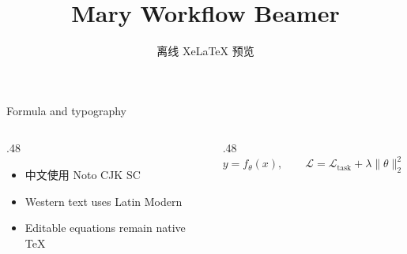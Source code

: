 \documentclass[aspectratio=169,10pt]{beamer}
\title[Mary Workflow]{Mary Workflow Beamer}
\subtitle{离线 XeLaTeX 预览}
\date{}
\begin{document}
\VSPtitleframe

\begin{frame}{Formula and typography}
  \begin{columns}[T,onlytextwidth]
    \begin{column}{.48\textwidth}
      \begin{itemize}
        \item 中文使用 Noto CJK SC
        \item Western text uses Latin Modern
        \item Editable equations remain native TeX
      \end{itemize}
    \end{column}
    \begin{column}{.48\textwidth}
      \[
        y=f_{\theta}(x),\qquad
        \mathcal{L}=\mathcal{L}_{\mathrm{task}}+\lambda\lVert\theta\rVert_2^2.
      \]
    \end{column}
  \end{columns}
\end{frame}

\end{document}

